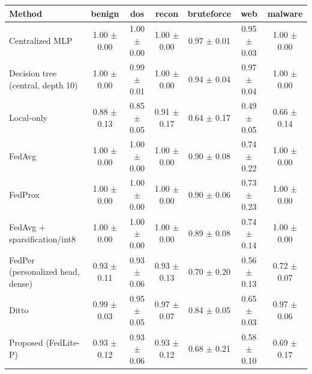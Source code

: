 \begin{tabular}{lcccccc}
\toprule
Method & benign & dos & recon & bruteforce & web & malware\\
\midrule
Centralized MLP & 1.00 $\pm$ 0.00 & 1.00 $\pm$ 0.00 & 1.00 $\pm$ 0.00 & 0.97 $\pm$ 0.01 & 0.95 $\pm$ 0.03 & 1.00 $\pm$ 0.00\\
Decision tree (central, depth 10) & 1.00 $\pm$ 0.00 & 0.99 $\pm$ 0.01 & 1.00 $\pm$ 0.00 & 0.94 $\pm$ 0.04 & 0.97 $\pm$ 0.04 & 1.00 $\pm$ 0.00\\
Local-only & 0.88 $\pm$ 0.13 & 0.85 $\pm$ 0.05 & 0.91 $\pm$ 0.17 & 0.64 $\pm$ 0.17 & 0.49 $\pm$ 0.05 & 0.66 $\pm$ 0.14\\
FedAvg & 1.00 $\pm$ 0.00 & 1.00 $\pm$ 0.00 & 1.00 $\pm$ 0.00 & 0.90 $\pm$ 0.08 & 0.74 $\pm$ 0.22 & 1.00 $\pm$ 0.00\\
FedProx & 1.00 $\pm$ 0.00 & 1.00 $\pm$ 0.00 & 1.00 $\pm$ 0.00 & 0.90 $\pm$ 0.06 & 0.73 $\pm$ 0.23 & 1.00 $\pm$ 0.00\\
FedAvg + sparsification/int8 & 1.00 $\pm$ 0.00 & 1.00 $\pm$ 0.00 & 1.00 $\pm$ 0.00 & 0.89 $\pm$ 0.08 & 0.74 $\pm$ 0.14 & 1.00 $\pm$ 0.00\\
FedPer (personalized head, dense) & 0.93 $\pm$ 0.11 & 0.93 $\pm$ 0.06 & 0.93 $\pm$ 0.13 & 0.70 $\pm$ 0.20 & 0.56 $\pm$ 0.13 & 0.72 $\pm$ 0.07\\
Ditto & 0.99 $\pm$ 0.03 & 0.95 $\pm$ 0.05 & 0.97 $\pm$ 0.07 & 0.84 $\pm$ 0.05 & 0.65 $\pm$ 0.03 & 0.97 $\pm$ 0.06\\
Proposed (FedLite-P) & 0.93 $\pm$ 0.12 & 0.93 $\pm$ 0.06 & 0.93 $\pm$ 0.12 & 0.68 $\pm$ 0.21 & 0.58 $\pm$ 0.10 & 0.69 $\pm$ 0.17\\
\bottomrule
\end{tabular}